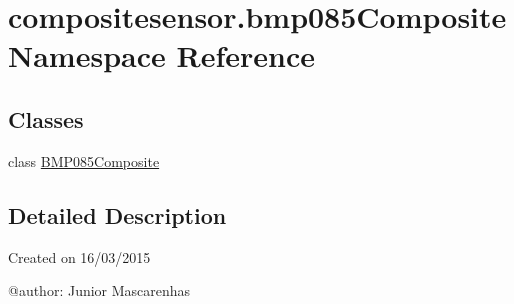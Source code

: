 \hypertarget{namespacecompositesensor_1_1bmp085Composite}{}\section{compositesensor.\+bmp085\+Composite Namespace Reference}
\label{namespacecompositesensor_1_1bmp085Composite}
\subsection*{Classes}
\begin{DoxyCompactItemize}
\item 
class \hyperlink{classcompositesensor_1_1bmp085Composite_1_1BMP085Composite}{B\+M\+P085\+Composite}
\end{DoxyCompactItemize}


\subsection{Detailed Description}
\begin{DoxyVerb}Created on 16/03/2015

@author: Junior Mascarenhas
\end{DoxyVerb}
 